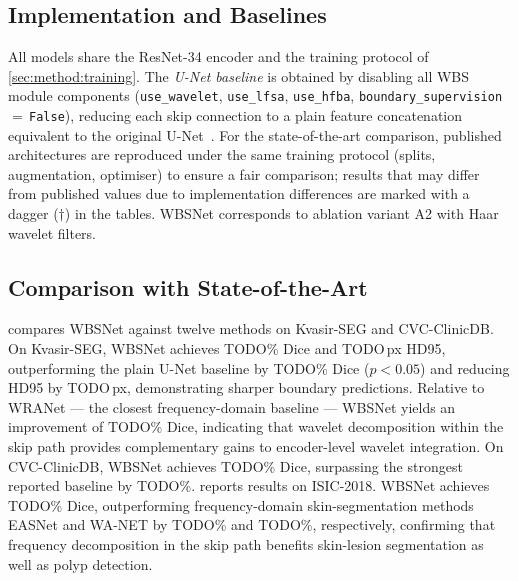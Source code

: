 \documentclass[journal]{IEEEtran}
\begin{document}
\subsection{Implementation and Baselines}\label{sec:exp:impl}

All models share the ResNet-34 encoder and the training protocol of
\cref{sec:method:training}.
The \textit{U-Net baseline} is obtained by disabling all WBS module components
(\texttt{use\_wavelet}, \texttt{use\_lfsa}, \texttt{use\_hfba},
\texttt{boundary\_supervision}\,$=$\,\texttt{False}), reducing each skip
connection to a plain feature concatenation equivalent to the original
U-Net~\cite{ronneberger2015unet}.
For the state-of-the-art comparison, published architectures are reproduced
under the same training protocol (splits, augmentation, optimiser) to ensure
a fair comparison; results that may differ from published values due to
implementation differences are marked with a dagger ($\dagger$) in the tables.
WBSNet corresponds to ablation variant A2 with Haar wavelet filters.

\subsection{Comparison with State-of-the-Art}\label{sec:exp:sota}

 compares WBSNet against twelve methods on Kvasir-SEG
and CVC-ClinicDB.
On Kvasir-SEG, WBSNet achieves TODO\% Dice and TODO\,px HD95, outperforming
the plain U-Net baseline by TODO\% Dice ($p < 0.05$) and reducing HD95 by
TODO\,px, demonstrating sharper boundary predictions.
Relative to WRANet --- the closest frequency-domain baseline --- WBSNet yields
an improvement of TODO\% Dice, indicating that wavelet decomposition within
the skip path provides complementary gains to encoder-level wavelet
integration.
On CVC-ClinicDB, WBSNet achieves TODO\% Dice, surpassing the strongest
reported baseline by TODO\%.
 reports results on ISIC-2018.
WBSNet achieves TODO\% Dice, outperforming frequency-domain skin-segmentation
methods EASNet and WA-NET by TODO\% and TODO\%, respectively, confirming
that frequency decomposition in the skip path benefits skin-lesion
segmentation as well as polyp detection.
\end{document}
